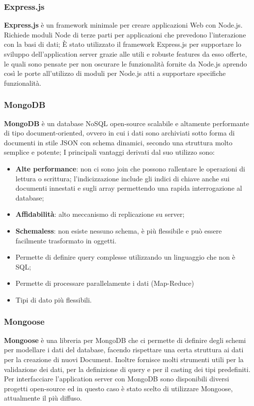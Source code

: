 \subsubsection{Express.js}
\textbf{Express.js} è un framework minimale per creare applicazioni Web con Node.js. Richiede moduli Node di terze parti per applicazioni che prevedono l’interazione con la basi di dati; \newline
\`E stato utilizzato il framework Express.js per supportare lo sviluppo dell'application server grazie alle utili e robuste features da esso offerte, le quali sono pensate per non oscurare le funzionalità fornite da Node.js aprendo così le porte all'utilizzo di moduli per Node.js atti a supportare specifiche funzionalità.

\subsubsection{MongoDB}
\textbf{MongoDB} è un database NoSQL open-source scalabile e altamente performante di tipo document-oriented, ovvero in cui i dati sono archiviati sotto forma di documenti in stile JSON con schema dinamici, secondo una struttura molto semplice e potente;
I principali vantaggi derivati dal suo utilizzo sono:
\begin{itemize}
	\item \textbf{Alte performance}: non ci sono join che possono rallentare le operazioni di lettura o scrittura; l’indicizzazione include gli indici di chiave anche sui documenti innestati e sugli array permettendo una rapida interrogazione al database;
	\item \textbf{Affidabilità}: alto meccanismo di replicazione su server;
	\item \textbf{Schemaless}: non esiste nessuno schema, è più flessibile e può essere facilmente trasformato in oggetti.	
	\item Permette di definire query complesse utilizzando un linguaggio che non è SQL;
	\item Permette di processare parallelamente i dati (Map-Reduce)
	\item Tipi di dato più flessibili.
\end{itemize}

\subsubsection{Mongoose}
\textbf{Mongoose} è una libreria per MongoDB che ci permette di definire degli schemi per modellare i dati del database, facendo rispettare una certa struttura ai dati per la creazione di nuovi Document. Inoltre fornisce molti strumenti utili per la validazione dei dati, per la definizione di query e per il casting dei tipi predefiniti. \newline
Per interfacciare l'application server con MongoDB sono disponibili diversi progetti open-source ed in questo caso è stato scelto di utilizzare Mongoose, attualmente il più diffuso.	

